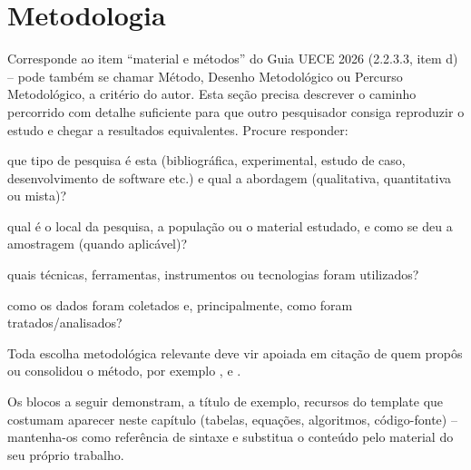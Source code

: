 \chapter{Metodologia}
\label{chap:metodologia}

Corresponde ao item ``material e métodos'' do Guia UECE 2026 (2.2.3.3, item d) -- pode também se chamar Método, Desenho Metodológico ou Percurso Metodológico, a critério do autor. Esta seção precisa descrever o caminho percorrido com detalhe suficiente para que outro pesquisador consiga reproduzir o estudo e chegar a resultados equivalentes. Procure responder:

\begin{alineas}
	\item que tipo de pesquisa é esta (bibliográfica, experimental, estudo de caso, desenvolvimento de software etc.) e qual a abordagem (qualitativa, quantitativa ou mista)?
	\item qual é o local da pesquisa, a população ou o material estudado, e como se deu a amostragem (quando aplicável)?
	\item quais técnicas, ferramentas, instrumentos ou tecnologias foram utilizados?
	\item como os dados foram coletados e, principalmente, como foram tratados/analisados?
\end{alineas}

Toda escolha metodológica relevante deve vir apoiada em citação de quem propôs ou consolidou o método, por exemplo \cite{lamport1986latex}, \cite{Maia2011} e \cite{ibge23}.

Os blocos a seguir demonstram, a título de exemplo, recursos do template que costumam aparecer neste capítulo (tabelas, equações, algoritmos, código-fonte) -- mantenha-os como referência de sintaxe e substitua o conteúdo pelo material do seu próprio trabalho.

\begin{table}[ht!]
\end{table}

